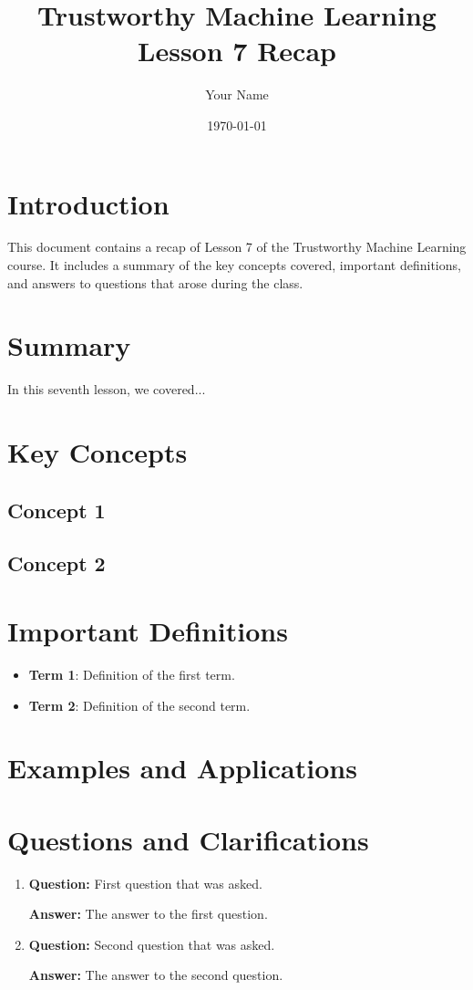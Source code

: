 \documentclass[11pt,a4paper]{article}
\title{Trustworthy Machine Learning\\
\large Lesson 7 Recap}
\author{Your Name}
\date{\today}
\newcommand{\concept}[1]{\textbf{#1}}
\begin{document}
\maketitle
\tableofcontents
\newpage

\section{Introduction}
This document contains a recap of Lesson 7 of the Trustworthy Machine Learning course. It includes a summary of the key concepts covered, important definitions, and answers to questions that arose during the class.

\section{Summary}
In this seventh lesson, we covered...

\section{Key Concepts}
\subsection{Concept 1}

\subsection{Concept 2}

\section{Important Definitions}
\begin{itemize}
    \item \concept{Term 1}: Definition of the first term.
    \item \concept{Term 2}: Definition of the second term.
\end{itemize}

\section{Examples and Applications}

\section{Questions and Clarifications}
\begin{enumerate}
    \item \textbf{Question:} First question that was asked.
    
    \textbf{Answer:} The answer to the first question.
    
    \item \textbf{Question:} Second question that was asked.
    
    \textbf{Answer:} The answer to the second question.
\end{enumerate}
\end{document}
